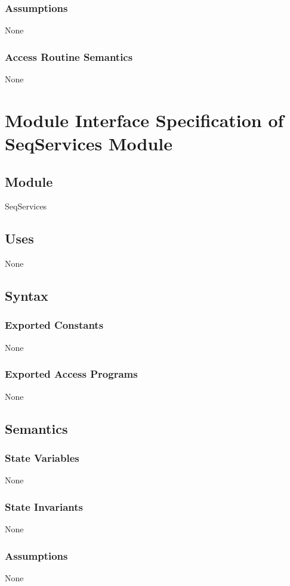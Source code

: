 \documentclass[12pt]{article}
\begin{document}
\subsubsection{Assumptions}
\label{Sec:Assumps}
None
\subsubsection{Access Routine Semantics}
\label{Sec:AccRoutSemantics}
None
\section{Module Interface Specification of SeqServices Module}
\label{Sec:SeqServices}
\subsection{Module}
\label{Sec:Module}
SeqServices
\subsection{Uses}
\label{Sec:Uses}
None
\subsection{Syntax}
\label{Sec:Syntax}
\subsubsection{Exported Constants}
\label{Sec:ExpConstants}
None
\subsubsection{Exported Access Programs}
\label{Sec:ExpAccPrograms}
None
\subsection{Semantics}
\label{Sec:Semantics}
\subsubsection{State Variables}
\label{Sec:StateVars}
None
\subsubsection{State Invariants}
\label{Sec:StateInvars}
None
\subsubsection{Assumptions}
\label{Sec:Assumps}
None
\end{document}

